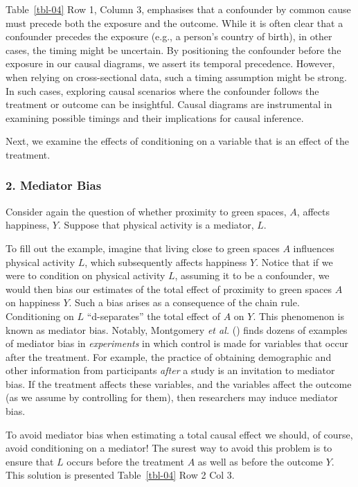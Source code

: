 \documentclass[
  singlecolumn]{article}
\begin{document}
Table~\ref{tbl-04} Row 1, Column 3, emphasises that a confounder by
common cause must precede both the exposure and the outcome. While it is
often clear that a confounder precedes the exposure (e.g., a person's
country of birth), in other cases, the timing might be uncertain. By
positioning the confounder before the exposure in our causal diagrams,
we assert its temporal precedence. However, when relying on
cross-sectional data, such a timing assumption might be strong. In such
cases, exploring causal scenarios where the confounder follows the
treatment or outcome can be insightful. Causal diagrams are instrumental
in examining possible timings and their implications for causal
inference.

Next, we examine the effects of conditioning on a variable that is an
effect of the treatment.

\subsubsection{2. Mediator Bias}\label{mediator-bias}

Consider again the question of whether proximity to green spaces, \(A\),
affects happiness, \(Y\). Suppose that physical activity is a mediator,
\(L\).

To fill out the example, imagine that living close to green spaces \(A\)
influences physical activity \(L\), which subsequently affects happiness
\(Y\). Notice that if we were to condition on physical activity \(L\),
assuming it to be a confounder, we would then bias our estimates of the
total effect of proximity to green spaces \(A\) on happiness \(Y\). Such
a bias arises as a consequence of the chain rule. Conditioning on \(L\)
``d-separates'' the total effect of \(A\) on \(Y\). This phenomenon is
known as mediator bias. Notably, Montgomery \emph{et al.}
() finds dozens of examples of
mediator bias in \emph{experiments} in which control is made for
variables that occur after the treatment. For example, the practice of
obtaining demographic and other information from participants
\emph{after} a study is an invitation to mediator bias. If the treatment
affects these variables, and the variables affect the outcome (as we
assume by controlling for them), then researchers may induce mediator
bias.

To avoid mediator bias when estimating a total causal effect we should,
of course, avoid conditioning on a mediator! The surest way to avoid
this problem is to ensure that \(L\) occurs before the treatment \(A\)
as well as before the outcome \(Y\). This solution is presented
Table~\ref{tbl-04} Row 2 Col 3.
\end{document}
